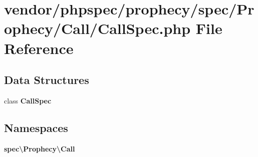 \section{vendor/phpspec/prophecy/spec/\+Prophecy/\+Call/\+Call\+Spec.php File Reference}
\label{_call_spec_8php}
\subsection*{Data Structures}
\begin{DoxyCompactItemize}
\item 
class {\bf Call\+Spec}
\end{DoxyCompactItemize}
\subsection*{Namespaces}
\begin{DoxyCompactItemize}
\item 
 {\bf spec\textbackslash{}\+Prophecy\textbackslash{}\+Call}
\end{DoxyCompactItemize}
